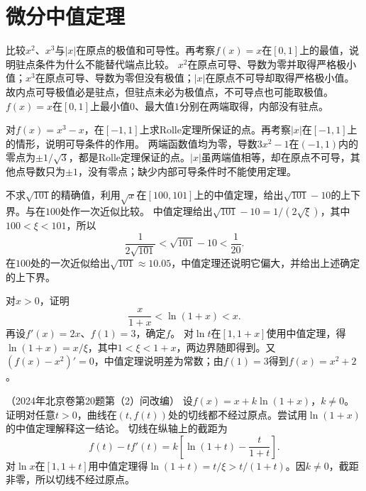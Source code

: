 \par\addvspace{12pt}

\section{微分中值定理}

比较\(x^2\)、\(x^3\)与\(|x|\)在原点的极值和可导性。再考察\(f(x)=x\)在\([0,1]\)上的最值，说明驻点条件为什么不能替代端点比较。
\solutionanswer
\(x^2\)在原点可导、导数为零并取得严格极小值；\(x^3\)在原点可导、导数为零但没有极值；\(|x|\)在原点不可导却取得严格极小值。故内点可导极值必是驻点，但驻点未必为极值点，不可导点也可能取极值。\(f(x)=x\)在\([0,1]\)上最小值\(0\)、最大值\(1\)分别在两端取得，内部没有驻点。


对\(f(x)=x^3-x\)，在\([-1,1]\)上求Rolle定理所保证的点。再考察\(|x|\)在\([-1,1]\)上的情形，说明可导条件的作用。
\solutionanswer
两端函数值均为零，导数\(3x^2-1\)在\((-1,1)\)内的零点为\(\pm1/\sqrt3\)，都是Rolle定理保证的点。\(|x|\)虽两端值相等，却在原点不可导，其他点导数只为\(\pm1\)，没有零点；缺少内部可导条件时不能使用定理。


不求\(\sqrt{101}\)的精确值，利用\(\sqrt x\)在\([100,101]\)上的中值定理，给出\(\sqrt{101}-10\)的上下界。与在\(100\)处作一次近似比较。
\solutionanswer
中值定理给出\(\sqrt{101}-10=1/(2\sqrt\xi)\)，其中\(100<\xi<101\)，所以
\[
 \frac1{2\sqrt{101}}<\sqrt{101}-10<\frac1{20}.
\]
在\(100\)处的一次近似给出\(\sqrt{101}\approx10.05\)，中值定理还说明它偏大，并给出上述确定的上下界。


对\(x>0\)，证明
\begin{equation*}
 \frac{x}{1+x}<\ln(1+x)<x.
\end{equation*}
再设\(f'(x)=2x\)、\(f(1)=3\)，确定\(f\)。
\solutionanswer
对\(\ln t\)在\([1,1+x]\)使用中值定理，得\(\ln(1+x)=x/\xi\)，其中\(1<\xi<1+x\)，两边界随即得到。又\((f(x)-x^2)'=0\)，中值定理说明差为常数；由\(f(1)=3\)得到\(f(x)=x^2+2\)。


（2024年北京卷第20题第（2）问改编）
设\(f(x)=x+k\ln(1+x)\)，\(k\ne0\)。证明对任意\(t>0\)，曲线在\((t,f(t))\)处的切线都不经过原点。尝试用\(\ln(1+x)\)的中值定理解释这一结论。
\solutionanswer
切线在纵轴上的截距为
\[
 f(t)-tf'(t)=k\left[\ln(1+t)-\frac{t}{1+t}\right].
\]
对\(\ln x\)在\([1,1+t]\)用中值定理得\(\ln(1+t)=t/\xi>t/(1+t)\)。因\(k\ne0\)，截距非零，所以切线不经过原点。


